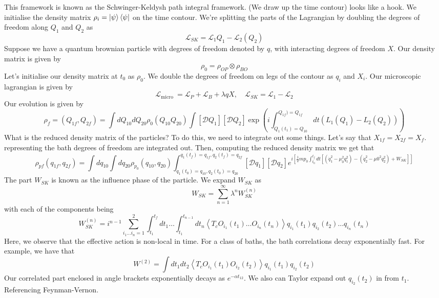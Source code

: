 \documentclass[11pt, a4paper]{article}   	%
\theoremstyle{slplain}
\begin{document}
This framework is known as the
Schwinger-Keldysh path integral framework. 
(We draw up the time contour) looks like a hook. 
We initialise the density matrix $ \rho_ i  = \ket{ \psi } \bra{ \psi } $ 
on the time contour. 
We're splitting the parts of the Lagrangian by 
doubling the degrees of freedom along $ Q_ 1 $ and $ Q _  2 $ 
as 
\[
	\mathcal{ L } _{ SK }  = \mathcal{ L } _ 1 Q _ 1 - \mathcal{ L } _ 2 ( Q _ 2 ) 
\] 
Suppose we have a quantum brownian particle 
with degrees of freedom denoted by $ q $, with 
interacting degrees of freedom $ X $. 
Our density matrix is given by 
\[
	\rho_ 0 = \rho _{ O P } \otimes \rho _{ B O }
\] 
Let's initialise our density matrix 
at $ t_0 $ as $ \rho_0 $. 
We double the degrees of freedom on legs of the contour 
as $ q_ i $  and $ X_ i $. 
Our microscopic lagrangian is given by 
\[
 \mathcal{ L } _{ \text{micro } }  = \mathcal{ L } _ P + \mathcal{ L } _ B 
 + \lambda q X , \quad \mathcal{ L } _{ SK }  = \mathcal{ L } _ 1 - \mathcal{ L } _ 2 
\] Our evolution is given 
by 
\[
	\rho_{ f} = \left(  Q _{ 1 f } , Q_{ 2 f}  \right)   = 
	\int d Q _{ 10 } d Q _{ 2 0 } \rho_0 ( Q_{ 10 } Q _{ 2 0 } ) \int 
	[ \mathcal{ D } Q_ 1 ] [ \mathcal{ D } Q _ 2 ] \exp \left(  
	i \int_{ Q_ 1 ( t_1 )  = Q_{ 10 } } ^{ Q_{ 1f } ) = Q_{ 1 f }} dt \left(  L _ 1 ( Q_ 1 )  - L _ 2 ( Q_ 2 )  \right) \right) 
\]
What is the reduced density matrix of the particles? 
To do this, we need to integrate out some things. 
Let's say that $ X_{ 1f } = X _{ 2f }  = X _  f $. 
representing the bath degrees of freedom 
are integrated out. 
Then, computing the reduced density matrix 
we get that 
\[
	\rho_{ p f }  ( q_{ 1f } , q_{ 2f } ) 
	= \int d q_{ 10 } \int d q_{ 20} \rho_{ p_0 } ( q_{ 10 } , q_{ 20} ) 
	\int_{ q_1 ( t_0 )  = q_{ 10 } , q_ 2 ( t_0 ) =  q_{ 20 } }
	^{ q_1 ( t_ f )  = q _{ 1f }, q_2 (t_ f ) = q_{ 2f }  } 
	\left[  \mathcal{ D } q_1  \right]  \left[  
	\mathcal{ D } q_ 2 \right]  
	e^{ i \left[  \frac{1}{2 } mp_0 \int_{ t_0 } ^{ t_ f }
	dt \left[ ( \dot{ q } _ 1 ^ 2  - \mu _ 0 ^ 2 q_1 ^ 2 ) 
	- ( \dot{ q } ^ 2 _ 2 - \mu 0 ^ 2 q_ 2 ^ 2 ) + W_{ SK } \right] \right] }
\] The part $ W _{ SK } $ is known as the influence 
phase of the particle. 
We expand $ W_{ SK} $ as 
\[
	W _{ SK } = \sum_{n=1}^{\infty } \lambda ^ n W _{ SK } ^{ ( n ) } 
\] with each of the components being 
\[
	W _{ SK } ^{ ( n ) }  = i ^{ n -1  } \sum_{ i_1  \dots i_n = 1 } ^ 2 
	\int _{ t_1 } ^{ t_  f } dt_1 \dots \int_{ t_1 } ^{ t _{ n- 1 } } 
	dt_ n \left< T _ c O_{ i_1 } ( t_1 ) \dots O _{ i _ n  } ( t_ n )   \right> q _{ i_1 } ( t _ 1 ) q _{ i_2 } ( t_ 2 ) \dots q_{ i _ n } ( t _ n ) 
\] Here, we observe that 
the effective action is non-local in time. 
For a class of baths, the bath correlations decay exponentially fast.
For example, we have that 
\[
	W ^{ ( 2) }  = \int dt_1 dt_2 
	\left< T _c O _{ i_1 } ( t_1 ) O_{ i_2 } ( t_2 )  \right> 
	q_{ i_1 } ( t_1 ) q_{ i_2 } ( t_2 ) 
\] Our 
correlated part enclosed in angle brackets exponentially 
decays as $ e ^{ - \alpha t _{ 12 } } $. 
We also can Taylor expand out $ q _{ i_2 } ( t_2) $  in 
from $ t_1 $. 
Referencing Feynman-Vernon. 
\end{document}
